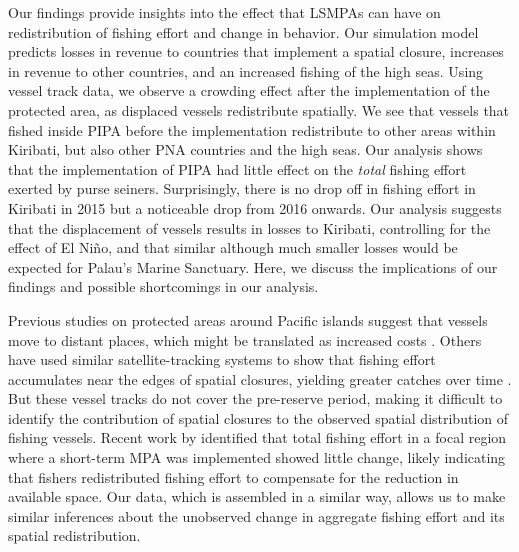 \documentclass[9p,twocolumn,twoside,lineno]{pnas-new}
\begin{document}
Our findings provide insights into the effect that LSMPAs can have on redistribution of fishing effort and change in behavior. Our simulation model predicts losses in revenue to countries that implement a spatial closure, increases in revenue to other countries, and an increased fishing of the high seas. Using vessel track data, we observe a crowding effect after the implementation of the protected area, as displaced vessels redistribute spatially. We see that vessels that fished inside PIPA before the implementation redistribute to other areas within Kiribati, but also other PNA countries and the high seas. Our analysis shows that the implementation of PIPA had little effect on the \emph{total} fishing effort exerted by purse seiners. Surprisingly, there is no drop off in fishing effort in Kiribati in 2015 but a noticeable drop from 2016 onwards. Our analysis suggests that the displacement of vessels results in losses to Kiribati, controlling for the effect of El Ni\~{n}o, and that similar although much smaller losses would be expected for Palau's Marine Sanctuary. Here, we discuss the implications of our findings and possible shortcomings in our analysis.

Previous studies on protected areas around Pacific islands suggest that vessels move to distant places, which might be translated as increased costs \citep{stevenson_2013}. Others have used similar satellite-tracking systems to show that fishing effort accumulates near the edges of spatial closures, yielding greater catches over time \citep{murawski_2005}. But these vessel tracks do not cover the pre-reserve period, making it difficult to identify the contribution of spatial closures to the observed spatial distribution of fishing vessels. Recent work by \cite{elahi_2018} identified that total fishing effort in a focal region where a short-term MPA was implemented showed little change, likely indicating that fishers redistributed fishing effort to compensate for the reduction in available space. Our data, which is assembled in a similar way, allows us to make similar inferences about the unobserved change in aggregate fishing effort and its spatial redistribution.
\end{document}
